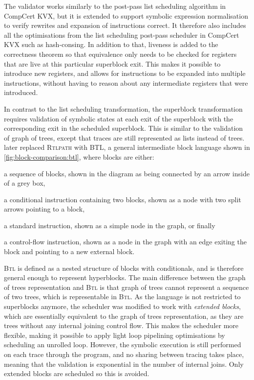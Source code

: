 The validator works similarly to the post-pass list scheduling algorithm in
CompCert KVX, but it is extended to support symbolic expression normalisation to
verify rewrites and expansion of instructions correct.  It therefore also
includes all the optimisations from the list scheduling post-pass scheduler in
CompCert KVX such as hash-consing.  In addition to that, liveness is added to
the correctness theorem so that equivalence only needs to be checked for
registers that are live at this particular superblock exit.  This makes it
possible to introduce new registers, and allows for instructions to be expanded
into multiple instructions, without having to reason about any intermediate
registers that were introduced.

In contrast to the list scheduling transformation, the superblock transformation
requires validation of symbolic states at each exit of the superblock with the
corresponding exit in the scheduled \gls{superblock}.  This is similar to the
validation of graph of trees, except that traces are still represented as lists
instead of trees.  \textcite[]{gourdin23_fvobs} later replaced \textsc{Rtlpath}
with \gls{BTL}, a general intermediate block language shown in
\cref{fig:block-comparison:btl}, where blocks are either:
\begin{enumerate*}[label=(\arabic*)]
\item a sequence of blocks, shown in the diagram as being connected by an arrow
  inside of a grey box,
\item a conditional instruction containing two blocks, shown as a node with two
  split arrows pointing to a block,
\item a standard instruction, shown as a simple node in the graph, or finally
\item a control-flow instruction, shown as a node in the graph with an edge
  exiting the block and pointing to a new external block.
\end{enumerate*}
\textsc{Btl} is defined as a nested structure of blocks with conditionals, and
is therefore general enough to represent \glspl{hyperblock}.  The main
difference between the graph of trees representation and \textsc{Btl} is that
graph of trees cannot represent a sequence of two trees, which is representable
in \textsc{Btl}.  As the language is not restricted to superblocks anymore, the
scheduler was modified to work with \emph{extended blocks}, which are
essentially equivalent to the graph of trees representation, as they are trees
without any internal joining \gls{control flow}.  This makes the scheduler more
flexible, making it possible to apply light loop pipelining optimisations by
scheduling an unrolled loop.  However, the symbolic execution is still performed
on each trace through the program, and no sharing between tracing takes place,
meaning that the validation is exponential in the number of internal joins.
Only extended blocks are scheduled so this is avoided.

